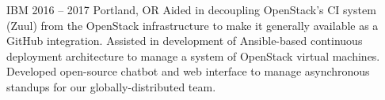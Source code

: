 {IBM}
{2016 -- 2017}
{Portland, OR}
{Aided in decoupling OpenStack's CI system (Zuul) from the OpenStack infrastructure to make it generally available as a GitHub integration. Assisted in development of Ansible-based continuous deployment architecture to manage a system of OpenStack virtual machines. Developed open-source chatbot and web interface to manage asynchronous standups for our globally-distributed team.}
